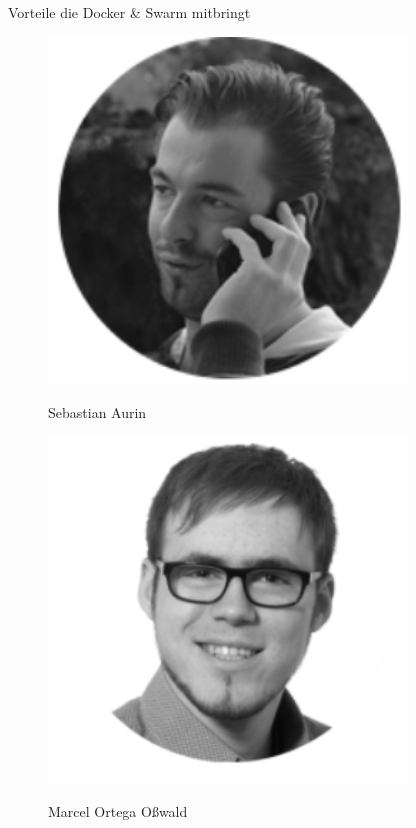 \documentclass[final]{beamer}
\newlength{\onecolwid}
\begin{document}
\begin{frame}
\begin{columns}[t]
\begin{column}{\onecolwid}
\begin{block}{Vorteile die Docker \& Swarm mitbringt}
\begin{figure}
\begin{minipage}[t]{0.40\textwidth}\vspace{0pt} 
\includegraphics[width=0.85\textwidth]{sebastian} 
\begin{center}
	Sebastian Aurin
\end{center}
\end{minipage}\hfill%
\begin{minipage}[t]{0.40\textwidth}\vspace{0pt} 
\includegraphics[width=0.85\textwidth]{marcel} 
\begin{center}
	Marcel Ortega Oßwald
\end{center}
\end{minipage}\hfill%


\end{figure}
\end{block}
\end{column}
\end{columns}
\end{frame}
\end{document}

